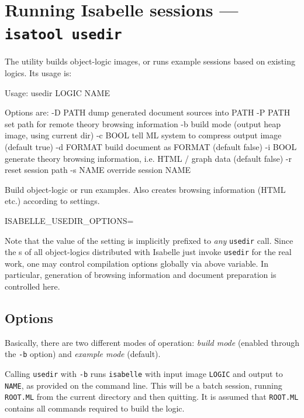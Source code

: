 \section{Running Isabelle sessions --- \texttt{isatool usedir}} \label{sec:tool-usedir}

The  utility builds object-logic images, or runs example
sessions based on existing logics. Its usage is:
\begin{ttbox}
Usage: usedir LOGIC NAME

  Options are:
    -D PATH      dump generated document sources into PATH
    -P PATH      set path for remote theory browsing information
    -b           build mode (output heap image, using current dir)
    -c BOOL      tell ML system to compress output image (default true)
    -d FORMAT    build document as FORMAT (default false)
    -i BOOL      generate theory browsing information,
                 i.e. HTML / graph data (default false)
    -r           reset session path
    -s NAME      override session NAME

  Build object-logic or run examples. Also creates browsing
  information (HTML etc.) according to settings.

  ISABELLE_USEDIR_OPTIONS=
\end{ttbox}

Note that the value of the  setting is
implicitly prefixed to \emph{any} \texttt{usedir} call. Since the
s of all object-logics distributed with Isabelle just
invoke \texttt{usedir} for the real work, one may control compilation options
globally via above variable. In particular, generation of 
browsing information and document preparation is controlled here.


\subsection*{Options}

Basically, there are two different modes of operation: \emph{build mode}
(enabled through the \texttt{-b} option) and \emph{example mode} (default).

Calling \texttt{usedir} with \texttt{-b} runs \texttt{isabelle} with input
image \texttt{LOGIC} and output to \texttt{NAME}, as provided on the command
line. This will be a batch session, running \texttt{ROOT.ML} from the current
directory and then quitting.  It is assumed that \texttt{ROOT.ML} contains all
{\ML} commands required to build the logic.

